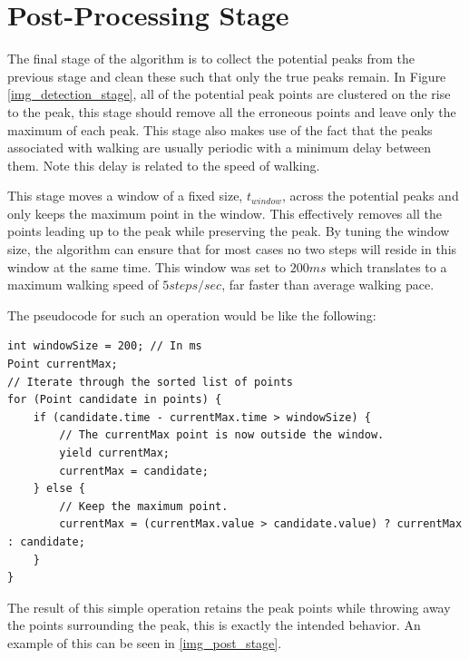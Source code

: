         \section{Post-Processing Stage}

            The final stage of the algorithm is to collect the potential peaks from the previous stage and clean these such that only the true peaks remain. In Figure \ref{img_detection_stage}, all of the potential peak points are clustered on the rise to the peak, this stage should remove all the erroneous points and leave only the maximum of each peak. This stage also makes use of the fact that the peaks associated with walking are usually periodic with a minimum delay between them. Note this delay is related to the speed of walking.

            This stage moves a window of a fixed size, $t_{window}$, across the potential peaks and only keeps the maximum point in the window. This effectively removes all the points leading up to the peak while preserving the peak. By tuning the window size, the algorithm can ensure that for most cases no two steps will reside in this window at the same time. This window was set to $200ms$ which translates to a maximum walking speed of $5 steps/sec$, far faster than average walking pace.

            The pseudocode for such an operation would be like the following:

            \begin{lstlisting}
int windowSize = 200; // In ms
Point currentMax;
// Iterate through the sorted list of points
for (Point candidate in points) {
    if (candidate.time - currentMax.time > windowSize) {
        // The currentMax point is now outside the window. 
        yield currentMax;
        currentMax = candidate;
    } else {
        // Keep the maximum point.
        currentMax = (currentMax.value > candidate.value) ? currentMax : candidate;
    }
}
            \end{lstlisting}

            The result of this simple operation retains the peak points while throwing away the points surrounding the peak, this is exactly the intended behavior. An example of this can be seen in \ref{img_post_stage}.

